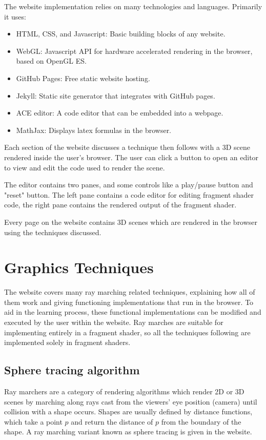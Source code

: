\documentclass[parskip=full]{scrartcl}
\begin{document}
The website implementation relies on many technologies and languages. Primarily
it uses:
\begin{itemize}
    \item HTML, CSS, and Javascript: Basic building blocks of any website.
    \item WebGL: Javascript API for hardware accelerated rendering in the
        browser, based on OpenGL ES.
    \item GitHub Pages: Free static website hosting.
    \item Jekyll: Static site generator that integrates with GitHub pages.
    \item ACE editor: A code editor that can be embedded into a webpage.
    \item MathJax: Displays latex formulas in the browser.
\end{itemize}

Each section of the website discusses a technique then follows with a 3D scene
rendered inside the user's browser. The user can click a button to open an
editor to view and edit the code used to render the scene.

The editor contains two panes, and some controls like a play/pause button and
"reset" button. The left pane contains a code editor for editing fragment
shader code, the right pane contains the rendered output of the fragment
shader.

Every page on the website contains 3D scenes which are rendered in the browser
using the techniques discussed.

\section{Graphics Techniques}

The website covers many ray marching related techniques, explaining how all of
them work and giving functioning implementations that run in the browser. To
aid in the learning process, these functional implementations can be modified
and executed by the user within the website. Ray marches are suitable for
implementing entirely in a fragment shader, so all the techniques following are
implemented solely in fragment shaders.

\subsection{Sphere tracing algorithm}

Ray marchers are a category of rendering algorithms which render 2D or 3D
scenes by marching along rays cast from the viewers' eye position (camera)
until collision with a shape occurs. Shapes are usually defined by distance
functions, which take a point $p$ and return the distance of $p$ from the
boundary of the shape. A ray marching variant known as sphere tracing is given
in the website.
\end{document}
